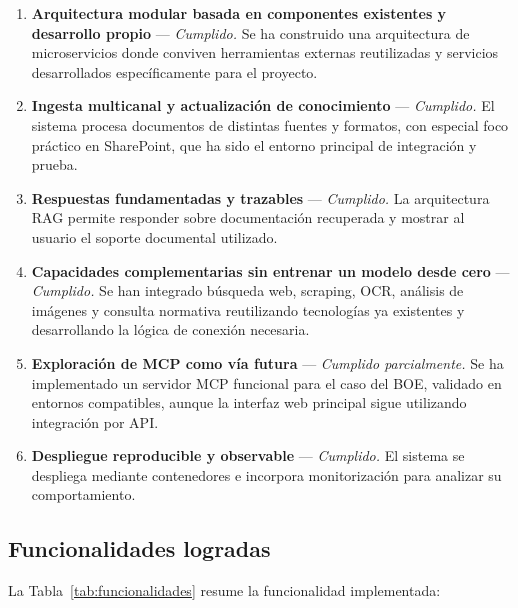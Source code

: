 \begin{enumerate}
    \item \textbf{Arquitectura modular basada en componentes existentes y desarrollo propio} --- \textit{Cumplido.} Se ha construido una arquitectura de microservicios donde conviven herramientas externas reutilizadas y servicios desarrollados específicamente para el proyecto.

    \item \textbf{Ingesta multicanal y actualización de conocimiento} --- \textit{Cumplido.} El sistema procesa documentos de distintas fuentes y formatos, con especial foco práctico en SharePoint, que ha sido el entorno principal de integración y prueba.

    \item \textbf{Respuestas fundamentadas y trazables} --- \textit{Cumplido.} La arquitectura RAG permite responder sobre documentación recuperada y mostrar al usuario el soporte documental utilizado.

    \item \textbf{Capacidades complementarias sin entrenar un modelo desde cero} --- \textit{Cumplido.} Se han integrado búsqueda web, scraping, OCR, análisis de imágenes y consulta normativa reutilizando tecnologías ya existentes y desarrollando la lógica de conexión necesaria.

    \item \textbf{Exploración de MCP como vía futura} --- \textit{Cumplido parcialmente.} Se ha implementado un servidor MCP funcional para el caso del BOE, validado en entornos compatibles, aunque la interfaz web principal sigue utilizando integración por API.

    \item \textbf{Despliegue reproducible y observable} --- \textit{Cumplido.} El sistema se despliega mediante contenedores e incorpora monitorización para analizar su comportamiento.
\end{enumerate}

\subsection{Funcionalidades logradas}

La Tabla~\ref{tab:funcionalidades} resume la funcionalidad implementada:

